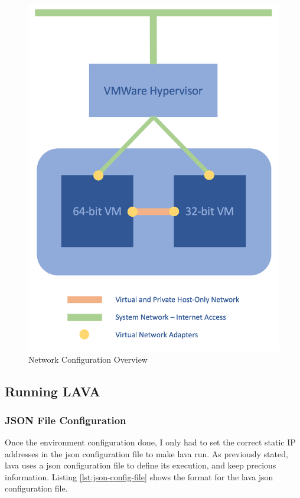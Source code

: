 \begin{figure}[ht]
    \centering
    \includegraphics[scale=0.45]{figures/network-configuration}
    \caption{Network Configuration Overview}
    \label{fig:network-configuration}
\end{figure}

\clearpage

\subsection{Running LAVA}
\label{sec:lava-example}

\subsubsection{JSON File Configuration}

Once the environment configuration done, I only had to set the correct static IP addresses in the \gls{json} configuration file to make \gls{lava} run. As previously stated, \gls{lava} uses a \gls{json} configuration file to define its execution, and keep precious information. Listing \ref{lst:json-config-file} shows the format for the \gls{lava} \gls{json} configuration file.

